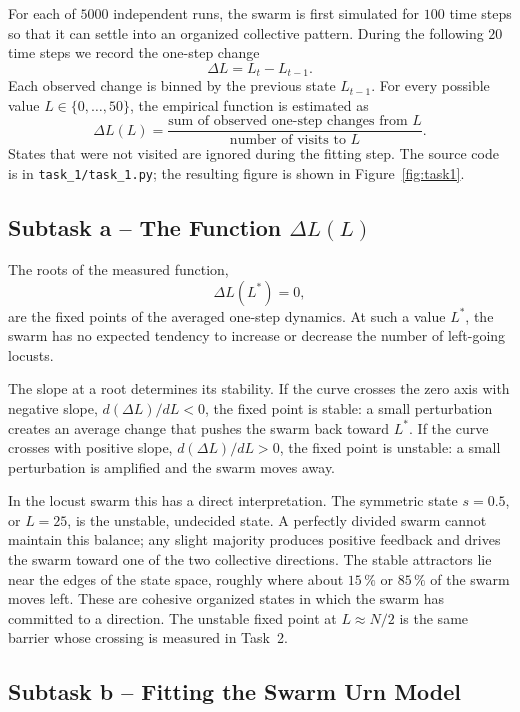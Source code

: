 \documentclass[12pt, a4paper]{article}
\begin{document}
For each of $5000$ independent runs, the swarm is first simulated for $100$ time
steps so that it can settle into an organized collective pattern.  During the
following $20$ time steps we record the one-step change
\[
    \Delta L = L_t - L_{t-1}.
\]
Each observed change is binned by the previous state $L_{t-1}$.  For every
possible value $L \in \{0,\dots,50\}$, the empirical function is estimated as
\[
    \Delta L(L) =
    \frac{\text{sum of observed one-step changes from } L}
         {\text{number of visits to } L}.
\]
States that were not visited are ignored during the fitting step.  The source
code is in \texttt{task\_1/task\_1.py}; the resulting figure is shown in
Figure~\ref{fig:task1}.

\subsection{Subtask a -- The Function \texorpdfstring{$\Delta L(L)$}{Delta L(L)}}

The roots of the measured function,
\[
    \Delta L(L^*) = 0,
\]
are the fixed points of the averaged one-step dynamics.  At such a value $L^*$,
the swarm has no expected tendency to increase or decrease the number of
left-going locusts.

The slope at a root determines its stability.  If the curve crosses the zero
axis with negative slope, $d(\Delta L)/dL < 0$, the fixed point is stable: a
small perturbation creates an average change that pushes the swarm back toward
$L^*$.  If the curve crosses with positive slope, $d(\Delta L)/dL > 0$, the
fixed point is unstable: a small perturbation is amplified and the swarm moves
away.

In the locust swarm this has a direct interpretation.  The symmetric state
$s = 0.5$, or $L = 25$, is the unstable, undecided state.  A perfectly divided
swarm cannot maintain this balance; any slight majority produces positive
feedback and drives the swarm toward one of the two collective directions.  The
stable attractors lie near the edges of the state space, roughly where about
$15\,\%$ or $85\,\%$ of the swarm moves left.  These are cohesive organized
states in which the swarm has committed to a direction.  The unstable fixed
point at $L \approx N/2$ is the same barrier whose crossing is measured in
Task~2.

\subsection{Subtask b -- Fitting the Swarm Urn Model}
\end{document}
